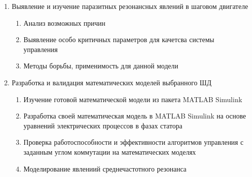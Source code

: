 \begin{enumerate}
    \item{Выявление и изучение паразитных резонансных явлений в шаговом двигателе}
        \begin{enumerate}
            \item Анализ возможных причин
            \item Выявление особо критичных параметров для качетсва системы управления
            \item Методы борьбы, применимость для данной модели
        \end{enumerate}

    \item{Разработка и валидация математических моделей выбранного ШД}
        \begin{enumerate}
            \item Изучение готовой математической модели из пакета \foreignlanguage{english}{MATLAB Simulink}
            \item Разработка своей математическая модель в \foreignlanguage{english}{MATLAB Simulink} на основе
                    уравнений электрических процессов в фазах статора
            \item Проверка работоспособности и эффективности алгоритмов управления с заданным углом
                    коммутации на математических моделях
            \item Моделирование явлениий среднечастотного резонанса
        \end{enumerate}
\end{enumerate}
